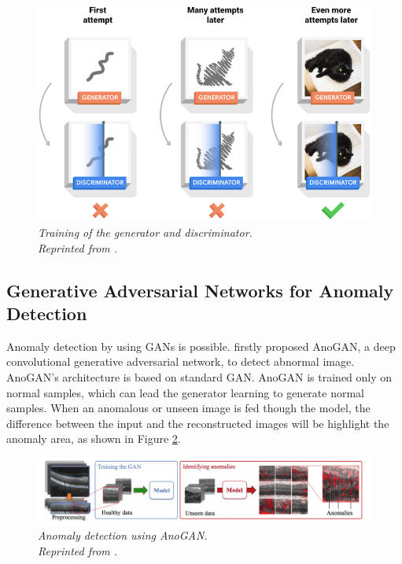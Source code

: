 \begin{figure}[H]
  \centering
  \caption[Training of the generator and discriminator.]{\emph{Training of the generator and discriminator. \\
      Reprinted from \citeauthor{tensorflow_2021} \citeyear{tensorflow_2021}.}}\label{fig:GAN_training}
  \includegraphics[scale = 0.5]{figures/GAN_2.jpg}
\end{figure}

\subsection{Generative Adversarial Networks for Anomaly Detection}

Anomaly detection by using GANs is possible.  \citeyear{schlegl2017unsupervised} firstly proposed AnoGAN, a deep convolutional generative adversarial network, to detect abnormal image. AnoGAN's architecture is based on standard GAN. AnoGAN is trained only on normal samples, which can lead the generator learning to generate normal samples. When an anomalous or unseen image is fed though the model, the difference between the input and the reconstructed images will be highlight the anomaly area, as shown in Figure \ref{fig:GAN_anomaly}.

\begin{figure}[H]
  \centering
  \caption[Anomaly detection using AnoGAN.]{\emph{Anomaly detection using AnoGAN. \\
      Reprinted from \citeauthor{schlegl2017unsupervised} \citeyear{schlegl2017unsupervised}.}}\label{fig:GAN_anomaly}
  \includegraphics[scale = 0.35]{figures/GAN_anomaly.jpg}
\end{figure}



